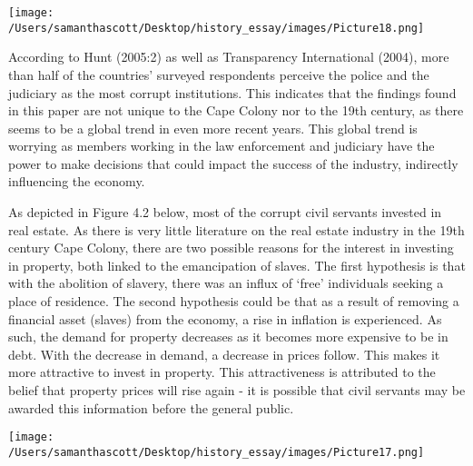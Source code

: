 \documentclass[12pt,preprint, authoryear]{elsarticle}
\let\origfigure\figure
\let\endorigfigure\endfigure
\renewenvironment{figure}[1][2] {
    \expandafter\origfigure\expandafter[H]
} {
    \endorigfigure
}
\numberwithin{equation}{section}
\numberwithin{figure}{section}
\numberwithin{table}{section}
\begin{document}
\begin{figure}
\centering
\texttt{[image: /Users/samanthascott/Desktop/history\_essay/images/Picture18.png]}
\caption{Number of Shares per Office}
\end{figure}

According to Hunt (2005:2) as well as Transparency International (2004),
more than half of the countries' surveyed respondents perceive the
police and the judiciary as the most corrupt institutions. This
indicates that the findings found in this paper are not unique to the
Cape Colony nor to the 19th century, as there seems to be a global trend
in even more recent years. This global trend is worrying as members
working in the law enforcement and judiciary have the power to make
decisions that could impact the success of the industry, indirectly
influencing the economy.

As depicted in Figure 4.2 below, most of the corrupt civil servants
invested in real estate. As there is very little literature on the real
estate industry in the 19th century Cape Colony, there are two possible
reasons for the interest in investing in property, both linked to the
emancipation of slaves. The first hypothesis is that with the abolition
of slavery, there was an influx of `free' individuals seeking a place of
residence. The second hypothesis could be that as a result of removing a
financial asset (slaves) from the economy, a rise in inflation is
experienced. As such, the demand for property decreases as it becomes
more expensive to be in debt. With the decrease in demand, a decrease in
prices follow. This makes it more attractive to invest in property. This
attractiveness is attributed to the belief that property prices will
rise again - it is possible that civil servants may be awarded this
information before the general public.

\begin{figure}
\centering
\texttt{[image: /Users/samanthascott/Desktop/history\_essay/images/Picture17.png]}
\caption{Number of Shares per Industry}
\end{figure}
\end{document}
